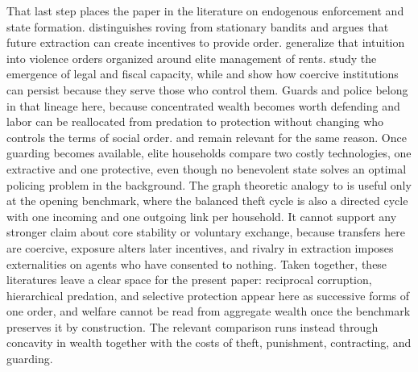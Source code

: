 That last step places the paper in the literature on endogenous enforcement and state formation. \citet{olson_1993} distinguishes roving from stationary bandits and argues that future extraction can create incentives to provide order. \citet{north_wallis_weingast_2009} generalize that intuition into violence orders organized around elite management of rents. \citet{besley_persson_2009} study the emergence of legal and fiscal capacity, while \citet{acemoglu_ticchi_vindigni_2011} and \citet{acemoglu_robinson_2008} show how coercive institutions can persist because they serve those who control them. Guards and police belong in that lineage here, because concentrated wealth becomes worth defending and labor can be reallocated from predation to protection without changing who controls the terms of social order. \citet{becker_1968} and \citet{becker_stigler_1974} remain relevant for the same reason. Once guarding becomes available, elite households compare two costly technologies, one extractive and one protective, even though no benevolent state solves an optimal policing problem in the background. The graph theoretic analogy to \citet{shapley_scarf_1974} is useful only at the opening benchmark, where the balanced theft cycle is also a directed cycle with one incoming and one outgoing link per household. It cannot support any stronger claim about core stability or voluntary exchange, because transfers here are coercive, exposure alters later incentives, and rivalry in extraction imposes externalities on agents who have consented to nothing. Taken together, these literatures leave a clear space for the present paper: reciprocal corruption, hierarchical predation, and selective protection appear here as successive forms of one order, and welfare cannot be read from aggregate wealth once the benchmark preserves it by construction. The relevant comparison runs instead through concavity in wealth together with the costs of theft, punishment, contracting, and guarding.
